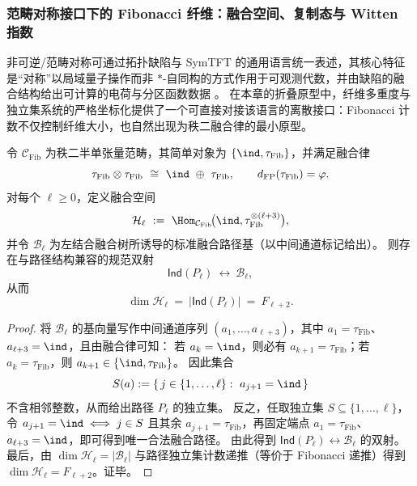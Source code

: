 \subsubsection{范畴对称接口下的 Fibonacci 纤维：融合空间、复制态与 Witten 指数}\label{subsubsec:pom-fiber-categorical-symmetry-fibonacci-fusion}
非可逆/范畴对称可通过拓扑缺陷与 SymTFT 的通用语言统一表述，其核心特征是“对称”以局域量子操作而非 \(\ast\)-自同构的方式作用于可观测代数，并由缺陷的融合结构给出可计算的电荷与分区函数数据 \cite{BhardwajSchaferNameki2025GeneralizedChargesII}。
在本章的折叠原型中，纤维多重度与独立集系统的严格坐标化提供了一个可直接对接该语言的离散接口：Fibonacci 计数不仅控制纤维大小，也自然出现为秩二融合律的最小原型。

\begin{proposition}\label{prop:pom-fiber-fibonacci-anyon-fusion-path-bijection}
令 \(\mathcal C_{\mathrm{Fib}}\) 为秩二半单张量范畴，其简单对象为 \(\{\ind,\tau_{\mathrm{Fib}}\}\)，并满足融合律
\[
\tau_{\mathrm{Fib}}\otimes \tau_{\mathrm{Fib}}\ \cong\ \ind\ \oplus\ \tau_{\mathrm{Fib}},
\qquad
d_{\mathrm{FP}}(\tau_{\mathrm{Fib}})=\varphi .
\]
对每个 \(\ell\ge 0\)，定义融合空间
\[
\mathcal H_\ell\ :=\ \Hom_{\mathcal C_{\mathrm{Fib}}}\!\bigl(\ind,\tau_{\mathrm{Fib}}^{\otimes(\ell+3)}\bigr),
\]
并令 \(\mathcal B_\ell\) 为左结合融合树所诱导的标准融合路径基（以中间通道标记给出）。
则存在与路径结构兼容的规范双射
\[
\mathsf{Ind}(P_\ell)\ \longleftrightarrow\ \mathcal B_\ell,
\]
从而
\[
\dim \mathcal H_\ell\ =\ |\mathsf{Ind}(P_\ell)|\ =\ F_{\ell+2}.
\]
\end{proposition}

\begin{proof}
将 \(\mathcal B_\ell\) 的基向量写作中间通道序列 \((a_1,\dots,a_{\ell+3})\)，其中 \(a_1=\tau_{\mathrm{Fib}}\)、\(a_{\ell+3}=\ind\)，且由融合律可知：
若 \(a_k=\ind\)，则必有 \(a_{k+1}=\tau_{\mathrm{Fib}}\)；若 \(a_k=\tau_{\mathrm{Fib}}\)，则 \(a_{k+1}\in\{\ind,\tau_{\mathrm{Fib}}\}\)。
因此集合
\[
S(a):=\{\,j\in\{1,\dots,\ell\}:\ a_{j+1}=\ind\,\}
\]
不含相邻整数，从而给出路径 \(P_\ell\) 的独立集。
反之，任取独立集 \(S\subseteq\{1,\dots,\ell\}\)，令 \(a_{j+1}=\ind\iff j\in S\) 且其余 \(a_{j+1}=\tau_{\mathrm{Fib}}\)，再固定端点 \(a_1=\tau_{\mathrm{Fib}}\)、\(a_{\ell+3}=\ind\)，即可得到唯一合法融合路径。
由此得到 \(\mathsf{Ind}(P_\ell)\leftrightarrow \mathcal B_\ell\) 的双射。
最后，由 \(\dim \mathcal H_\ell=|\mathcal B_\ell|\) 与路径独立集计数递推（等价于 Fibonacci 递推）得到 \(\dim \mathcal H_\ell=F_{\ell+2}\)。证毕。
\end{proof}

